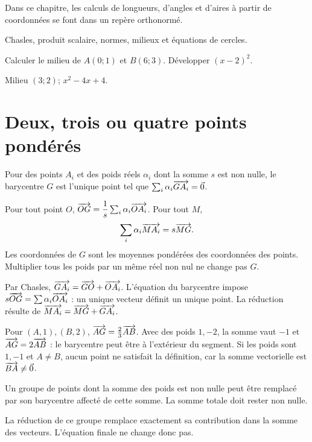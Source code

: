 \label{t11s-c14}
Dans ce chapitre, les calculs de longueurs, d’angles et d’aires à partir de coordonnées se font dans un repère orthonormé.
\begin{revision}Chasles, produit scalaire, normes, milieux et équations de cercles.\end{revision}
\begin{automatismes}\exo\label{t11s-c14-auto}Calculer le milieu de $A(0;1)$ et $B(6;3)$. Développer $(x-2)^2$.\end{automatismes}
\begin{corrige}\label{sol-t11s-c14-auto}Milieu $(3;2)$; $x^2-4x+4$.\end{corrige}

\section{Deux, trois ou quatre points pondérés}
\begin{definition}Pour des points $A_i$ et des poids réels $\alpha_i$ dont la somme $s$ est non nulle, le barycentre $G$ est l’unique point tel que $\sum_i\alpha_i\overrightarrow{GA_i}=\vec0$.\end{definition}
\begin{propriete}
Pour tout point $O$, $\overrightarrow{OG}=\dfrac1s\sum_i\alpha_i\overrightarrow{OA_i}$. Pour tout $M$,
\[
\sum_i\alpha_i\overrightarrow{MA_i}=s\overrightarrow{MG}.
\]
Les coordonnées de $G$ sont les moyennes pondérées des coordonnées des points. Multiplier tous les poids par un même réel non nul ne change pas $G$.
\end{propriete}
\begin{demonstration}Par Chasles, $\overrightarrow{GA_i}=\overrightarrow{GO}+\overrightarrow{OA_i}$. L’équation du barycentre impose $s\overrightarrow{OG}=\sum\alpha_i\overrightarrow{OA_i}$ : un unique vecteur définit un unique point. La réduction résulte de $\overrightarrow{MA_i}=\overrightarrow{MG}+\overrightarrow{GA_i}$.\end{demonstration}
\begin{exemple}Pour $(A,1),(B,2)$, $\overrightarrow{AG}=\tfrac23\overrightarrow{AB}$. Avec des poids $1,-2$, la somme vaut $-1$ et $\overrightarrow{AG}=2\overrightarrow{AB}$ : le barycentre peut être à l’extérieur du segment. Si les poids sont $1,-1$ et $A\ne B$, aucun point ne satisfait la définition, car la somme vectorielle est $\overrightarrow{BA}\ne\vec0$.\end{exemple}
\begin{propriete}[associativité]Un groupe de points dont la somme des poids est non nulle peut être remplacé par son barycentre affecté de cette somme. La somme totale doit rester non nulle.\end{propriete}
\begin{demonstration}La réduction de ce groupe remplace exactement sa contribution dans la somme des vecteurs. L’équation finale ne change donc pas.\end{demonstration}
